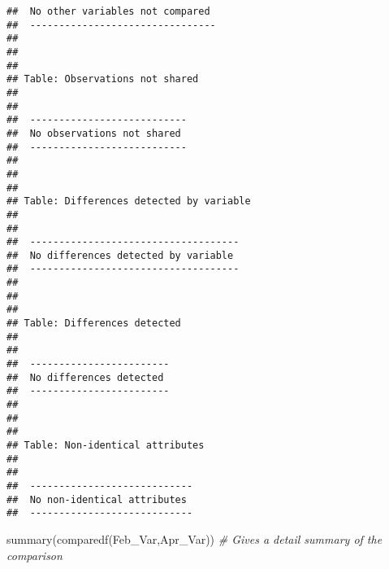 \documentclass[
]{article}
\newenvironment{Shaded}{\begin{snugshade}}{\end{snugshade}}
\newcommand{\CommentTok}[1]{\textcolor[rgb]{0.56,0.35,0.01}{\textit{#1}}}
\newcommand{\FunctionTok}[1]{\textcolor[rgb]{0.00,0.00,0.00}{#1}}
\newcommand{\NormalTok}[1]{#1}
\begin{document}
\begin{verbatim}
##  No other variables not compared 
##  --------------------------------
## 
## 
## 
## Table: Observations not shared
## 
##                             
##  ---------------------------
##  No observations not shared 
##  ---------------------------
## 
## 
## 
## Table: Differences detected by variable
## 
##                                      
##  ------------------------------------
##  No differences detected by variable 
##  ------------------------------------
## 
## 
## 
## Table: Differences detected
## 
##                          
##  ------------------------
##  No differences detected 
##  ------------------------
## 
## 
## 
## Table: Non-identical attributes
## 
##                              
##  ----------------------------
##  No non-identical attributes 
##  ----------------------------
\end{verbatim}

\begin{Shaded}
\begin{Highlighting}[]
 \FunctionTok{summary}\NormalTok{(}\FunctionTok{comparedf}\NormalTok{(Feb\_Var,Apr\_Var))  }\CommentTok{\# Gives a detail summary of the comparison}
\end{Highlighting}
\end{Shaded}
\end{document}
